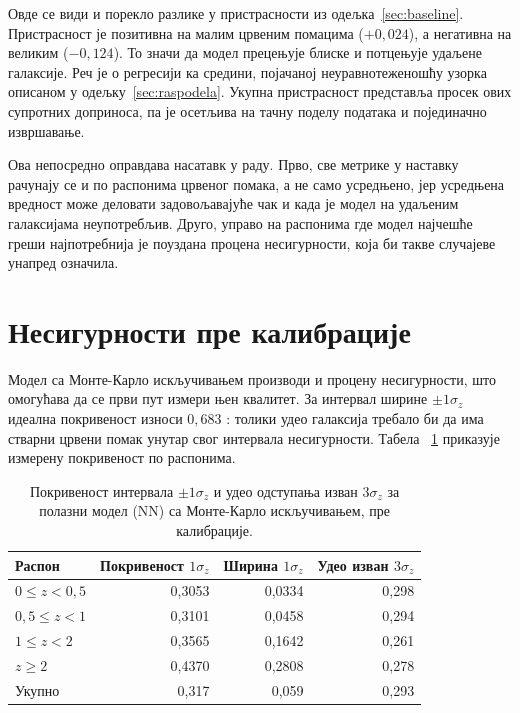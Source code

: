 \documentclass[12pt,oneside]{memoir}
\newcommand{\sigz}{\sigma_z}
\begin{document}
Овде се види и порекло разлике у пристрасности из
одељка~\ref{sec:baseline}. Пристрасност је позитивна на малим црвеним
помацима ($+0{,}024$), а негативна на великим ($-0{,}124$). То значи да модел прецењује
блиске и потцењује удаљене галаксије. Реч је о регресији ка средини,
појачаној неуравнотеженошћу узорка описаном у
одељку~\ref{sec:raspodela}. Укупна пристрасност представља просек ових
супротних доприноса, па је осетљива на тачну поделу података и појединачно
извршавање.

Ова непосредно оправдава насатавк у раду. Прво, све метрике у
наставку рачунају се и по распонима црвеног помака, а не само усредњено, јер
усредњена вредност може деловати задовољавајуће чак и када је модел на
удаљеним галаксијама неупотребљив. Друго, управо на распонима где модел
најчешће греши најпотребнија је поуздана процена несигурности, која би такве
случајеве унапред означила.

\section{Несигурности пре калибрације}
\label{sec:pre-kalibracije}
 
Модел са Монте-Карло искључивањем производи и процену несигурности, што
омогућава да се први пут измери њен квалитет. За интервал ширине $\pm 1\sigz$
идеална покривеност износи $0{,}683$ \cite{jones2024a}: толики удео галаксија требало би да има
стварни црвени помак унутар свог интервала несигурности. Табела~
\ref{tab:mcd-pokrivenost} приказује измерену покривеност по распонима.

\begin{table}[htbp]
\centering
\caption{Покривеност интервала $\pm 1\sigz$ и удео одступања изван $3\sigz$
за полазни модел (NN) са Монте-Карло искључивањем, пре калибрације.}
\label{tab:mcd-pokrivenost}
\begin{tabular}{lrrr}
\toprule
Распон & Покривеност $1\sigz$ & Ширина $1\sigz$ & Удео изван $3\sigz$ \\
\midrule
$0 \le z < 0{,}5$ & 0,3053 & 0,0334 & 0,298 \\
$0{,}5 \le z < 1$ & 0,3101 & 0,0458 & 0,294 \\
$1 \le z < 2$     & 0,3565 & 0,1642 & 0,261 \\
$z \ge 2$         & 0,4370 & 0,2808 & 0,278 \\
\midrule
Укупно            & 0,317 & 0,059 & 0,293 \\
\bottomrule
\end{tabular}
\end{table}
\end{document}
